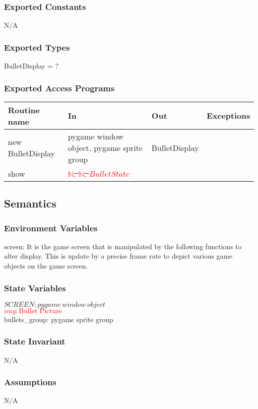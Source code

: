 \documentclass[12pt]{article}
\begin{document}
\subsubsection*{Exported Constants}
N/A
\subsubsection*{Exported Types}
BulletDisplay = ?

\subsubsection*{Exported Access Programs}

\begin{tabular}{| l | l | l | l |}
\hline
\textbf{Routine name} & \textbf{In} & \textbf{Out} & \textbf{Exceptions}\\
\hline
new BulletDisplay       &pygame window object, pygame sprite group&     BulletDisplay        &           \\
\hline
show       &	\textcolor{red}{\st{$\mathbb{N}$, $\mathbb{N}$, $BulletState$   }}  &           &          \\
\hline
\end{tabular}

\subsection*{Semantics}
\subsubsection*{Environment Variables}
screen: It is the game screen that is manipulated by the following functions to alter display. This is update by a precise frame rate to depict various game objects on the game screen.
\subsubsection*{State Variables}
$SCREEN: pygame\ window\ object$\\
\textcolor{red}{\st{$img: \text{Bullet Picture}$}}\\
bullets\_group: pygame sprite group
\subsubsection*{State Invariant}
N/A
\subsubsection*{Assumptions}
N/A
\end{document}
